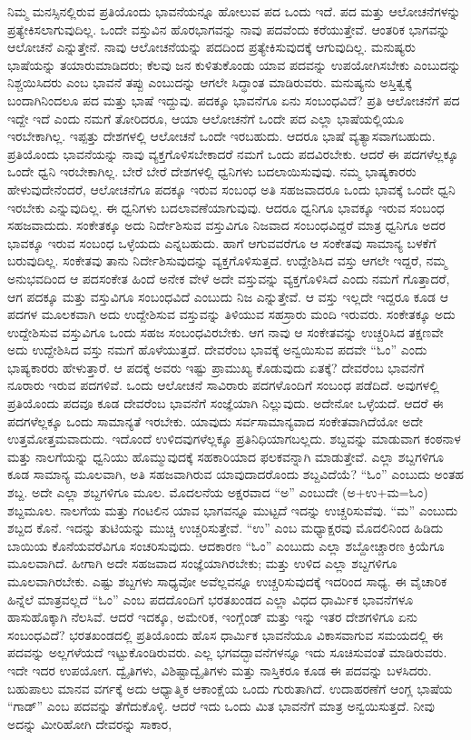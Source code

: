 ನಿಮ್ಮ ಮನಸ್ಸಿನಲ್ಲಿರುವ ಪ್ರತಿಯೊಂದು ಭಾವನೆಯನ್ನೂ ಹೋಲುವ ಪದ ಒಂದು ಇದೆ. ಪದ ಮತ್ತು ಆಲೋಚನೆಗಳನ್ನು ಪ್ರತ್ಯೇಕಿಸಲಾಗುವುದಿಲ್ಲ. ಒಂದೇ ವಸ್ತುವಿನ ಹೊರಭಾಗವನ್ನು ನಾವು ಪದವೆಂದು ಕರೆಯುತ್ತೇವೆ. ಆಂತರಿಕ ಭಾಗವನ್ನು ಆಲೋಚನೆ ಎನ್ನುತ್ತೇನೆ. ನಾವು ಆಲೋಚನೆಯನ್ನು ಪದದಿಂದ ಪ್ರತ್ಯೇಕಿಸುವುದಕ್ಕೆ ಆಗುವುದಿಲ್ಲ. ಮನುಷ್ಯರು ಭಾಷೆಯನ್ನು ತಯಾರುಮಾಡಿದರು; ಕೆಲವು ಜನ ಕುಳಿತುಕೊಂಡು ಯಾವ ಪದವನ್ನು ಉಪಯೋಗಿಸಬೇಕು ಎಂಬುದನ್ನು ನಿಶ್ಚಯಿಸಿದರು ಎಂಬ ಭಾವನೆ ತಪ್ಪು ಎಂಬುದನ್ನು ಆಗಲೇ ಸಿದ್ಧಾಂತ ಮಾಡಿರುವರು. ಮನುಷ್ಯನು ಅಸ್ತಿತ್ವಕ್ಕೆ ಬಂದಾಗಿನಿಂದಲೂ ಪದ ಮತ್ತು ಭಾಷೆ ಇದ್ದುವು. ಪದಕ್ಕೂ ಭಾವನೆಗೂ ಏನು ಸಂಬಂಧವಿದೆ? ಪ್ರತಿ ಆಲೋಚನೆಗೆ ಪದ ಇದ್ದೇ ಇದೆ ಎಂದು ನಮಗೆ ತೋರಿದರೂ, ಆಯಾ ಆಲೋಚನೆಗೆ ಒಂದೇ ಪದ ಎಲ್ಲಾ ಭಾಷೆಯಲ್ಲಿಯೂ ಇರಬೇಕಾಗಿಲ್ಲ. ಇಪ್ಪತ್ತು ದೇಶಗಳಲ್ಲಿ ಆಲೋಚನೆ ಒಂದೇ ಇರಬಹುದು. ಆದರೂ ಭಾಷೆ ವ್ಯತ್ಯಾಸವಾಗಬಹುದು. ಪ್ರತಿಯೊಂದು ಭಾವನೆಯನ್ನು ನಾವು ವ್ಯಕ್ತಗೊಳಿಸಬೇಕಾದರೆ ನಮಗೆ ಒಂದು ಪದವಿರಬೇಕು. ಆದರೆ ಈ ಪದಗಳೆಲ್ಲಕ್ಕೂ ಒಂದೇ ಧ್ವನಿ ಇರಬೇಕಾಗಿಲ್ಲ. ಬೇರೆ ಬೇರೆ ದೇಶಗಳಲ್ಲಿ ಧ್ವನಿಗಳು ಬದಲಾಯಿಸುವುವು. ನಮ್ಮ ಭಾಷ್ಯಕಾರರು ಹೇಳುವುದೇನೆಂದರೆ, ಆಲೋಚನೆಗೂ ಪದಕ್ಕೂ ಇರುವ ಸಂಬಂಧ ಅತಿ ಸಹಜವಾದರೂ ಒಂದು ಭಾವಕ್ಕೆ ಒಂದೇ ಧ್ವನಿ ಇರಬೇಕು ಎನ್ನುವುದಿಲ್ಲ. ಈ ಧ್ವನಿಗಳು ಬದಲಾವಣೆಯಾಗುವುವು. ಆದರೂ ಧ್ವನಿಗೂ ಭಾವಕ್ಕೂ ಇರುವ ಸಂಬಂಧ ಸಹಜವಾದುದು. ಸಂಕೇತಕ್ಕೂ ಅದು ನಿರ್ದೇಶಿಸುವ ವಸ್ತುವಿಗೂ ನಿಜವಾದ ಸಂಬಂಧವಿದ್ದರೆ ಮಾತ್ರ ಧ್ವನಿಗೂ ಅದರ ಭಾವಕ್ಕೂ ಇರುವ ಸಂಬಂಧ ಒಳ್ಳೆಯದು ಎನ್ನಬಹುದು. ಹಾಗೆ ಆಗುವವರೆಗೂ ಆ ಸಂಕೇತವು ಸಾಮಾನ್ಯ ಬಳಕೆಗೆ ಬರುವುದಿಲ್ಲ. ಸಂಕೇತವು ತಾನು ನಿರ್ದೇಶಿಸುವುದನ್ನು ವ್ಯಕ್ತಗೊಳಿಸುತ್ತದೆ. ಉದ್ದೇಶಿಸಿದ ವಸ್ತು ಆಗಲೇ ಇದ್ದರೆ, ನಮ್ಮ ಅನುಭವದಿಂದ ಆ ಪದಸಂಕೇತ ಹಿಂದೆ ಅನೇಕ ವೇಳೆ ಅದೇ ವಸ್ತುವನ್ನು ವ್ಯಕ್ತಗೊಳಿಸಿದೆ ಎಂದು ನಮಗೆ ಗೊತ್ತಾದರೆ, ಆಗ ಪದಕ್ಕೂ ಮತ್ತು ವಸ್ತುವಿಗೂ ಸಂಬಂಧವಿದೆ ಎಂಬುದು ನಿಜ ಎನ್ನುತ್ತೇವೆ. ಆ ವಸ್ತು ಇಲ್ಲದೇ ಇದ್ದರೂ ಕೂಡ ಆ ಪದಗಳ ಮೂಲಕವಾಗಿ ಅದು ಉದ್ದೇಶಿಸುವ ವಸ್ತುವನ್ನು ತಿಳಿಯುವ ಸಹಸ್ರಾರು ಮಂದಿ ಇರುವರು. ಸಂಕೇತಕ್ಕೂ ಅದು ಉದ್ದೇಶಿಸುವ ವಸ್ತುವಿಗೂ ಒಂದು ಸಹಜ ಸಂಬಂಧವಿರಬೇಕು. ಆಗ ನಾವು ಆ ಸಂಕೇತವನ್ನು ಉಚ್ಚರಿಸಿದ ತಕ್ಷಣವೇ ಅದು ಉದ್ದೇಶಿಸಿದ ವಸ್ತು ನಮಗೆ ಹೊಳೆಯುತ್ತದೆ. ದೇವರೆಂಬ ಭಾವಕ್ಕೆ ಅನ್ವಯಿಸುವ ಪದವೇ “ಓಂ” ಎಂದು ಭಾಷ್ಯಕಾರರು ಹೇಳುತ್ತಾರೆ. ಆ ಪದಕ್ಕೆ ಅವರು ಇಷ್ಟು ಪ್ರಾಮುಖ್ಯ ಕೊಡುವುದು ಏತಕ್ಕೆ? ದೇವರೆಂಬ ಭಾವನೆಗೆ ನೂರಾರು ಇರುವ ಪದಗಳಿವೆ. ಒಂದು ಆಲೋಚನೆ ಸಾವಿರಾರು ಪದಗಳೊಂದಿಗೆ ಸಂಬಂಧ ಪಡೆದಿದೆ. ಅವುಗಳಲ್ಲಿ ಪ್ರತಿಯೊಂದು ಪದವೂ ಕೂಡ ದೇವರೆಂಬ ಭಾವನೆಗೆ ಸಂಜ್ಞೆಯಾಗಿ ನಿಲ್ಲುವುದು. ಅದೇನೋ ಒಳ್ಳೆಯದೆ. ಆದರೆ ಈ ಪದಗಳೆಲ್ಲಕ್ಕೂ ಒಂದು ಸಾಮಾನ್ಯತೆ ಇರಬೇಕು. ಯಾವುದು ಸರ್ವಸಾಮಾನ್ಯವಾದ ಸಂಕೇತವಾಗಿದೆಯೋ ಅದೇ ಉತ್ತಮೋತ್ತಮವಾದುದು. ಇದೊಂದೆ ಉಳಿದವುಗಳೆಲ್ಲಕ್ಕೂ ಪ್ರತಿನಿಧಿಯಾಗಬಲ್ಲದು. ಶಬ್ದವನ್ನು ಮಾಡುವಾಗ ಕಂಠನಾಳ ಮತ್ತು ನಾಲಗೆಯನ್ನು ಧ್ವನಿಯು ಹೊಮ್ಮುವುದಕ್ಕೆ ಸಹಕಾರಿಯಾದ ಫಲಕವನ್ನಾಗಿ ಮಾಡುತ್ತೇವೆ. ಎಲ್ಲಾ ಶಬ್ದಗಳಿಗೂ ಕೂಡ ಸಾಮಾನ್ಯ ಮೂಲವಾಗಿ, ಅತಿ ಸಹಜವಾಗಿರುವ ಯಾವುದಾದರೊಂದು ಶಬ್ದವಿದೆಯೆ? “ಓಂ” ಎಂಬುದು ಅಂತಹ ಶಬ್ದ. ಅದೇ ಎಲ್ಲಾ ಶಬ್ದಗಳಿಗೂ ಮೂಲ. ಮೊದಲನೆಯ ಅಕ್ಷರವಾದ “ಅ” ಎಂಬುದೇ (ಅ+ಉ+ಮ=ಓಂ) ಶಬ್ದಮೂಲ. ನಾಲಗೆಯ ಮತ್ತು ಗಂಟಲಿನ ಯಾವ ಭಾಗವನ್ನೂ ಮುಟ್ಟದೆ ಇದನ್ನು ಉಚ್ಚರಿಸುವೆವು. “ಮ” ಎಂಬುದು ಶಬ್ದದ ಕೊನೆ. ಇದನ್ನು ತುಟಿಯನ್ನು ಮುಚ್ಚಿ ಉಚ್ಚರಿಸುತ್ತೇವೆ. “ಉ” ಎಂಬ ಮಧ್ಯಾಕ್ಷರವು ಮೊದಲಿನಿಂದ ಹಿಡಿದು ಬಾಯಿಯ ಕೊನೆಯವರೆವಿಗೂ ಸಂಚರಿಸುವುದು. ಆದಕಾರಣ “ಓಂ” ಎಂಬುದು ಎಲ್ಲಾ ಶಬ್ದೋಚ್ಚಾರಣ ಕ್ರಿಯೆಗೂ ಮೂಲವಾಗಿದೆ. ಹೀಗಾಗಿ ಅದೇ ಸಹಜವಾದ ಸಂಜ್ಞೆಯಾಗಿರಬೇಕು; ಮತ್ತು ಉಳಿದ ಎಲ್ಲಾ ಶಬ್ದಗಳಿಗೂ ಮೂಲವಾಗಿರಬೇಕು. ಎಷ್ಟು ಶಬ್ದಗಳು ಸಾಧ್ಯವೋ ಅವೆಲ್ಲವನ್ನೂ ಉಚ್ಚರಿಸುವುದಕ್ಕೆ ಇದರಿಂದ ಸಾಧ್ಯ. ಈ ವೈಚಾರಿಕ ಹಿನ್ನೆಲೆ ಮಾತ್ರವಲ್ಲದೆ “ಓಂ” ಎಂಬ ಪದದೊಂದಿಗೆ ಭರತಖಂಡದ ಎಲ್ಲಾ ವಿಧದ ಧಾರ್ಮಿಕ ಭಾವನೆಗಳೂ ಹಾಸುಹೊಕ್ಕಾಗಿ ನೆಲಸಿವೆ. ಆದರೆ ಇದಕ್ಕೂ, ಅಮೇರಿಕ, ಇಂಗ್ಲೆಂಡ್​ ಮತ್ತು ಇನ್ನು ಇತರ ದೇಶಗಳಿಗೂ ಏನು ಸಂಬಂಧವಿದೆ? ಭರತಖಂಡದಲ್ಲಿ ಪ್ರತಿಯೊಂದು ಹೊಸ ಧಾರ್ಮಿಕ ಭಾವನೆಯೂ ವಿಕಾಸವಾಗುವ ಸಮಯದಲ್ಲಿ ಈ ಪದವನ್ನು ಅಲ್ಲಗಳೆಯದೆ ಇಟ್ಟುಕೊಂಡಿರುವರು. ಎಲ್ಲ ಭಗವದ್ಭಾವನೆಗಳನ್ನೂ ಇದು ಸೂಚಿಸುವಂತೆ ಮಾಡಿರುವರು. ಇದೇ ಇದರ ಉಪಯೋಗ. ದ್ವೈತಿಗಳು, ವಿಶಿಷ್ಟಾದ್ವೈತಿಗಳು ಮತ್ತು ನಾಸ್ತಿಕರೂ ಕೂಡ ಈ ಪದವನ್ನು ಬಳಸಿದರು. ಬಹುಪಾಲು ಮಾನವ ವರ್ಗಕ್ಕೆ ಅದು ಆಧ್ಯಾತ್ಮಿಕ ಆಕಾಂಕ್ಷೆಯ ಒಂದು ಗುರುತಾಗಿದೆ. ಉದಾಹರಣೆಗೆ ಆಂಗ್ಲ ಭಾಷೆಯ “ಗಾಡ್​” ಎಂಬ ಪದವನ್ನು ತೆಗೆದುಕೊಳ್ಳಿ. ಆದರೆ ಇದು ಒಂದು ಮಿತ ಭಾವನೆಗೆ ಮಾತ್ರ ಅನ್ವಯಿಸುತ್ತದೆ. ನೀವು ಅದನ್ನು ಮೀರಿಹೋಗಿ ದೇವರನ್ನು ಸಾಕಾರ, 
